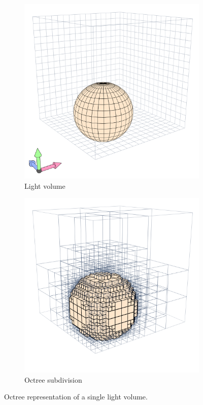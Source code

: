 \begin{figure}
  \centering
  \begin{subfigure}[b]{.45\linewidth}
    \includegraphics[width=\textwidth]{./img/raw/hs-slt/hs-slt_left.png}%
    \caption{Light volume}%
    \label{fig:hs-slt-left}%
  \end{subfigure} %
  \begin{subfigure}[b]{.45\linewidth}%
    \includegraphics[width=\textwidth]{./img/raw/hs-slt/hs-slt_right.png}%
    \caption{Octree subdivision}%
    \label{fig:hs-slt-right}%
  \end{subfigure}
  \caption{Octree representation of a single light volume.}
  \label{fig:hs-slt}
\end{figure}
